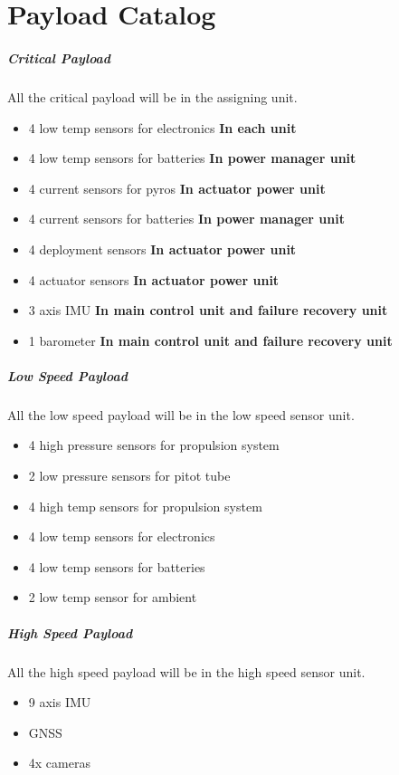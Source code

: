 \documentclass[12pt,article]{memoir}
\begin{document}
\section{Payload Catalog}

\subparagraph{Critical Payload}
All the critical payload will be in the assigning unit.
\begin{itemize}
\item 4 low temp sensors for electronics \textbf{In each unit}
\item 4 low temp sensors for batteries \textbf{In power manager unit}
\item 4 current sensors for pyros \textbf{In actuator power unit}
\item 4 current sensors for batteries \textbf{In power manager unit}
\item 4 deployment sensors \textbf{In actuator power unit}
\item 4 actuator sensors \textbf{In actuator power unit}
\item 3 axis IMU \textbf{In main control unit and failure recovery unit}
\item 1 barometer  \textbf{In main control unit and failure recovery unit}
\end{itemize}

\subparagraph{Low Speed Payload}
All the low speed payload will be in the low speed sensor unit.
\begin{itemize}
\item 4 high pressure sensors for propulsion system
\item 2 low pressure sensors for pitot tube
\item 4 high temp sensors for propulsion system
\item 4 low temp sensors for electronics
\item 4 low temp sensors for batteries
\item 2 low temp sensor for ambient
\end{itemize}

\subparagraph{High Speed Payload}
All the high speed payload will be in the high speed sensor unit.
\begin{itemize}
\item 9 axis IMU
\item GNSS
\item 4x cameras
\end{itemize}

\clearpage
\end{document}
